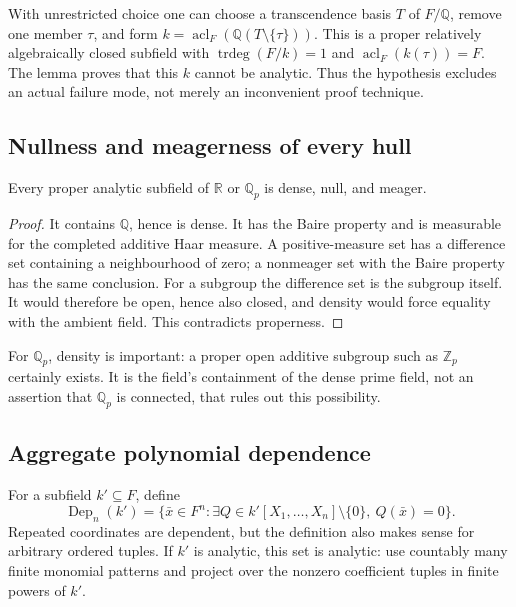 \documentclass[11pt]{article}
\theoremstyle{definition}
\theoremstyle{remark}
\newcommand{\R}{\mathbb{R}}
\newcommand{\Q}{\mathbb{Q}}
\newcommand{\Qp}{\mathbb{Q}_p}
\newcommand{\Zp}{\mathbb{Z}_p}
\newcommand{\acl}{\operatorname{acl}}
\newcommand{\trdeg}{\operatorname{trdeg}}
\newcommand{\Dep}{\operatorname{Dep}}
\begin{document}
\begin{remark}\label{isg:ptg:rem:analytic}
With unrestricted choice one can choose a transcendence basis $T$ of
$F/\Q$, remove one member $\tau$, and form
$k=\acl_F(\Q(T\setminus\{\tau\}))$. This is a proper relatively
algebraically closed subfield with $\trdeg(F/k)=1$ and
$\acl_F(k(\tau))=F$. The lemma proves that this $k$ cannot be analytic.
Thus the hypothesis excludes an actual failure mode, not merely an
inconvenient proof technique.
\end{remark}

\subsection{Nullness and meagerness of every hull}
\begin{lemma}\label{isg:ptg:lem:small}
Every proper analytic subfield of $\R$ or $\Qp$ is dense, null, and meager.
\end{lemma}
\begin{proof}
It contains $\Q$, hence is dense. It has the Baire property and is
measurable for the completed additive Haar measure. A positive-measure set
has a difference set containing a neighbourhood of zero; a nonmeager set
with the Baire property has the same conclusion. For a subgroup the
difference set is the subgroup itself. It would therefore be open, hence
also closed, and density would force equality with the ambient field. This
contradicts properness.
\end{proof}

For $\Qp$, density is important: a proper open additive subgroup such as
$\Zp$ certainly exists. It is the field's containment of the dense prime
field, not an assertion that $\Qp$ is connected, that rules out this
possibility.

\subsection{Aggregate polynomial dependence}
For a subfield $k'\subseteq F$, define
\[
 \Dep_n(k')=\{\bar x\in F^n:
   \exists Q\in k'[X_1,\ldots,X_n]\setminus\{0\},\ Q(\bar x)=0\}.
\]
Repeated coordinates are dependent, but the definition also makes sense
for arbitrary ordered tuples. If $k'$ is analytic, this set is analytic:
use countably many finite monomial patterns and project over the nonzero
coefficient tuples in finite powers of $k'$.
\end{document}
